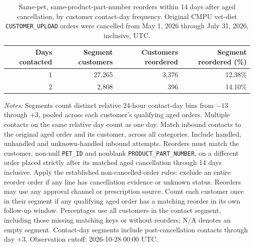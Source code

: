 \begin{table}[!htbp]
\centering
\caption{Same-pet, same-product-part-number reorders within 14 days after aged cancellation, by customer contact-day frequency. Original CMPU vet-diet \texttt{CUSTOMER\_UPLOAD} orders were cancelled from May 1, 2026 through July 31, 2026, inclusive, UTC.}
\label{tab:contact-frequency-same-pet-part-reorders}
\begin{tabular}{@{}rrrr@{}}
\toprule
Days contacted & Segment customers & Customers reordered & Segment reordered (\%) \\
\midrule

1 & 27,265 & 3,376 & 12.38\% \\

2 & 2,808 & 396 & 14.10\% \\
\bottomrule
\end{tabular}

\begin{minipage}{\linewidth}
\footnotesize
\textit{Notes:} Segments count distinct relative 24-hour contact-day bins from
$-13$ through $+3$, pooled across each customer's qualifying aged orders.
Multiple contacts on the same relative day count as one day. Match inbound
contacts to the original aged order and its customer, across all categories.
Include handled, unhandled and unknown-handled inbound attempts. Reorders must match the customer, non-null \texttt{PET\_ID} and nonblank
\texttt{PRODUCT\_PART\_NUMBER}, on a different order placed strictly after
its matched aged cancellation through 14 days inclusive. Apply the established
non-cancelled-order rules: exclude an entire reorder order if any line has
cancellation evidence or unknown status. Reorders may use any approval channel
or prescription source. Count each customer once in their segment if any
qualifying aged order has a matching reorder in its own follow-up window.
Percentages use all customers in the contact segment, including those missing
matching keys or without reorders; N/A denotes an empty segment. Contact-day
segments include post-cancellation contacts through day $+3$.
Observation cutoff: 2026-10-28 00:00 UTC.
\end{minipage}
\end{table}